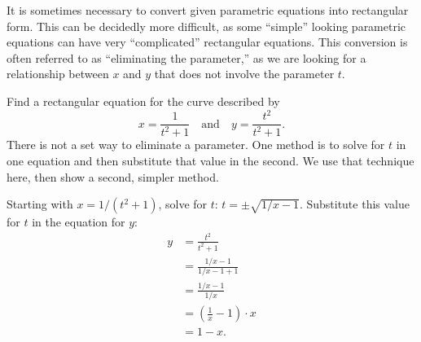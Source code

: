 It is  sometimes necessary to convert given parametric equations into rectangular form. This can be decidedly more difficult, as some ``simple'' looking parametric equations can have very ``complicated'' rectangular equations. This conversion is often referred to as ``eliminating the parameter,'' as we are looking for a relationship between $x$ and $y$ that does not involve the parameter $t$.

\begin{example}\label{ex_pareq7}
Find a rectangular equation for the curve described by
\[x= \frac{1}{t^2+1}\quad \text{and}\quad y=\frac{t^2}{t^2+1}.\]
\solution
There is not a set way to eliminate a parameter. One method is to solve for $t$ in one equation and then substitute that value in the second. We use that technique here, then show a second, simpler method.

Starting with $x= 1/(t^2+1)$, solve for $t$: $ t = \pm\sqrt{1/x-1}$. Substitute this value for $t$ in the equation for $y$:
\begin{align*}
 y &= \frac{t^2}{t^2 +1} \\
		&= \frac{1/x-1}{1/x-1+1} \\
		&= \frac{1/x - 1}{1/x} \\
		&= \left(\frac1x-1\right)\cdot x \\
		&= 1-x.
\end{align*}



\end{example}
